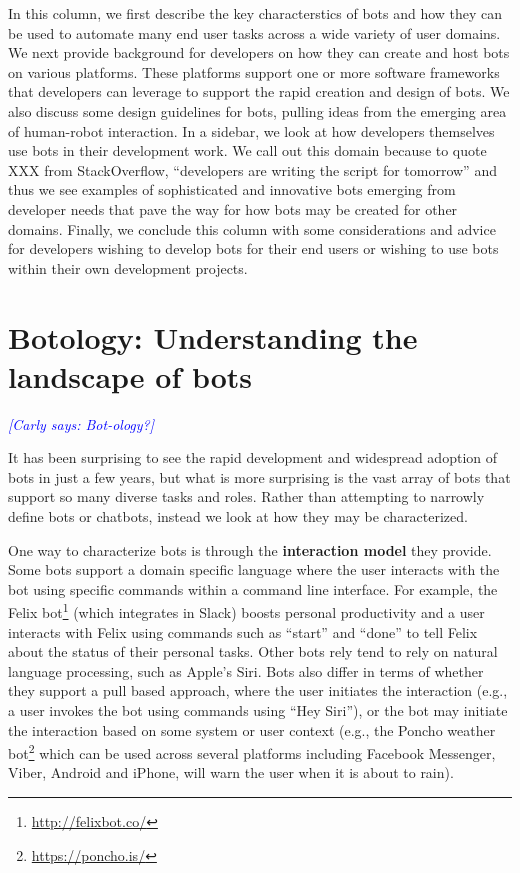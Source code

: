 \documentclass{sig-alternate}
\newcommand{\cl}[1]{\textcolor{blue}{{\it [Carly says: #1]}}}
\begin{document}
In this column, we first describe the key characterstics of bots and how they can be used to automate many end user tasks across a wide variety of user domains.  
We next provide background for developers on how they can create and host bots on various platforms. These platforms support one or more software frameworks that developers can leverage to support the rapid creation and design of bots. We also discuss some design guidelines for bots, pulling ideas from the emerging area of human-robot interaction. 
In a sidebar, we look at how developers themselves use bots in their development work.  We call out this domain because to quote XXX from StackOverflow, ``developers are writing the script for tomorrow'' and thus we see examples of sophisticated and innovative bots emerging from developer needs that pave the way for how bots may be created for other domains.
Finally, we conclude this column with some considerations and advice for developers wishing to develop bots for their end users or wishing to use bots within their own development projects.   

  

\section{Botology: Understanding the landscape of bots}
\cl{Bot-ology?}



It has been surprising to see the rapid development and widespread adoption of bots in just a few years, but what is more surprising is the vast array of bots that support so many diverse tasks and roles.  
Rather than attempting to narrowly define bots or chatbots, instead we look at how they may be characterized. 

One way to characterize bots is through the \textbf{interaction model} they provide. 
Some bots support a domain specific language where the user interacts with the bot using specific commands within a command line interface.  For example, the Felix bot\footnote{\url{http://felixbot.co/}} (which integrates in Slack) boosts personal productivity and a user interacts with Felix using commands such as ``start'' and ``done'' to tell Felix about the status of their personal tasks.   
Other bots rely tend to rely on natural language processing, such as Apple's Siri.
Bots also differ in terms of whether they support a pull based approach, where the user initiates the interaction (e.g., a user invokes the bot using commands using ``Hey Siri''), or the bot may initiate the interaction based on some system or user context (e.g., the Poncho weather bot\footnote{\url{https://poncho.is/}} which can be used across several platforms including Facebook Messenger, Viber, Android and iPhone, will warn the user when it is about to rain). 
\end{document}
